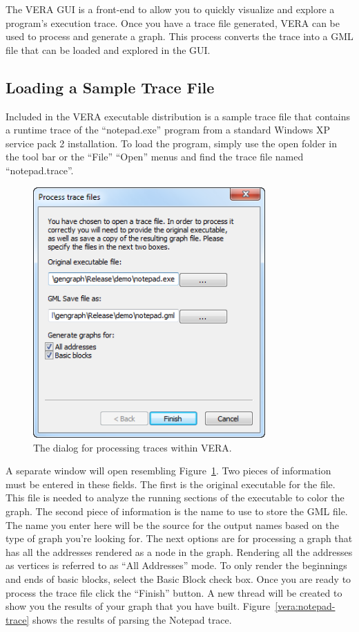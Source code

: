 \documentclass[11pt]{article}
\begin{document}
The VERA GUI is a front-end to allow you to quickly visualize and
explore a program's execution trace. Once you have a trace file
generated, VERA can be used to process and generate a graph. This
process converts the trace into a GML file that can be loaded and
explored in the GUI.

\subsection{Loading a Sample Trace File}

Included in the VERA executable distribution is a sample trace file
that contains a runtime trace of the ``notepad.exe'' program from a
standard Windows XP service pack 2 installation. To load the program,
simply use the open folder in the tool bar or the ``File'' ``Open''
menus and find the trace file named ``notepad.trace''.


\begin{figure}[htb]
  \centering
  \includegraphics[width=3.5in]{vera-trace-dialog.png}
  \caption{The dialog for processing traces within VERA.}\label{vera:trace-gen}
\end{figure}


A separate window will open resembling
Figure~\ref{vera:trace-gen}. Two pieces of information must be entered
in these fields. The first is the original executable for the
file. This file is needed to analyze the running sections of the
executable to color the graph. The second piece of information is the
name to use to store the GML file. The name you enter here will be the
source for the output names based on the type of graph you're looking
for. The next options are for processing a graph that has all the
addresses rendered as a node in the graph. Rendering all the addresses
as vertices is referred to as ``All Addresses'' mode. To only render the
beginnings and ends of basic blocks, select the Basic Block check
box. Once you are ready to process the trace file click the ``Finish''
button. A new thread will be created to show you the results of your
graph that you have built. Figure~\ref{vera:notepad-trace} shows the
results of parsing the Notepad trace.
\end{document}
